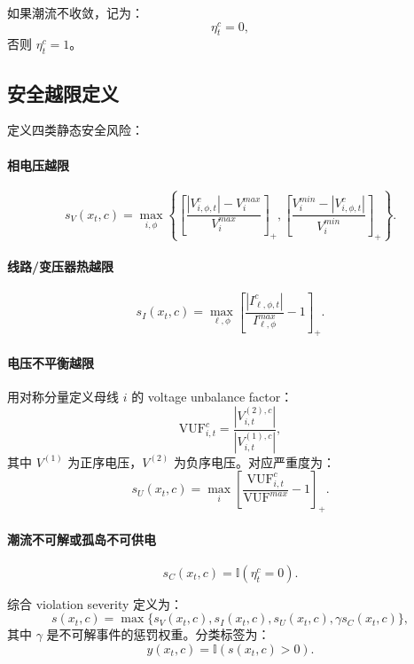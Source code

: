 \documentclass[UTF8,11pt]{ctexart}
\begin{document}
如果潮流不收敛，记为：
\begin{equation}
    \eta^{c}_{t}=0,
\end{equation}
否则 $\eta^{c}_{t}=1$。

\subsection{安全越限定义}

定义四类静态安全风险：

\paragraph{相电压越限}
\begin{equation}
    s_V(x_t,c) = \max_{i,\phi}\left\{\left[\frac{|V^{c}_{i,\phi,t}|-V^{max}_{i}}{V^{max}_{i}}\right]_+,\left[\frac{V^{min}_{i}-|V^{c}_{i,\phi,t}|}{V^{min}_{i}}\right]_+\right\}.
\end{equation}

\paragraph{线路/变压器热越限}
\begin{equation}
    s_I(x_t,c) = \max_{\ell,\phi}\left[\frac{|I^{c}_{\ell,\phi,t}|}{I^{max}_{\ell,\phi}} - 1\right]_+.
\end{equation}

\paragraph{电压不平衡越限}
用对称分量定义母线 $i$ 的 voltage unbalance factor：
\begin{equation}
    \mathrm{VUF}^{c}_{i,t} = \frac{|V^{(2),c}_{i,t}|}{|V^{(1),c}_{i,t}|},
\end{equation}
其中 $V^{(1)}$ 为正序电压，$V^{(2)}$ 为负序电压。对应严重度为：
\begin{equation}
    s_U(x_t,c) = \max_i \left[\frac{\mathrm{VUF}^{c}_{i,t}}{\mathrm{VUF}^{max}}-1\right]_+.
\end{equation}

\paragraph{潮流不可解或孤岛不可供电}
\begin{equation}
    s_C(x_t,c)=\mathbb{I}(\eta^{c}_{t}=0).
\end{equation}

综合 violation severity 定义为：
\begin{equation}
    s(x_t,c)=\max\{s_V(x_t,c),s_I(x_t,c),s_U(x_t,c),\gamma s_C(x_t,c)\},
\end{equation}
其中 $\gamma$ 是不可解事件的惩罚权重。分类标签为：
\begin{equation}
    y(x_t,c)=\mathbb{I}(s(x_t,c)>0).
\end{equation}
\end{document}
